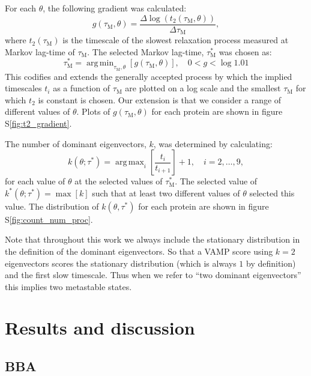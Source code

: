 \documentclass[journal=jacsat,manuscript=article]{achemso}
\DeclareMathOperator*{\argmax}{arg\,max}
\DeclareMathOperator*{\argmin}{arg\,min}
\newcommand*\sref[1]{%
    S\ref{#1}}
\begin{document}
For each $\theta$, the following gradient was calculated:
\begin{equation}
    g(\tau_{\mathrm{M}}, \theta) = \frac{\Delta \log{\left(t_{2}(\tau_{\mathrm{M}}, \theta)\right)}}{\Delta \tau_{\mathrm{M}}}, 
\end{equation}
where $t_{2}(\tau_{\mathrm{M}})$ is the timescale of the slowest relaxation process measured at Markov lag-time of $\tau_{\mathrm{M}}$. The selected Markov lag-time, $\tau^{*}_{\mathrm{M}}$ was chosen as:
\begin{equation}
    \tau^{*}_{\mathrm{M}}  = \argmin_{\tau_{\mathrm{M}}, \theta}\left[g(\tau_{\mathrm{M}}, \theta)\right], \quad 0 < g < \log{1.01}
\end{equation}
This codifies and extends the generally accepted process by which the implied timescales $t_{i}$ as a function of $\tau_{\mathrm{M}}$ are plotted on a log scale and the smallest $\tau_{\mathrm{M}}$ for which $t_{2}$ is constant is chosen. Our extension is that we consider a range of different values of $\theta$. Plots of $g(\tau_{\mathrm{M}}, \theta)$ for each protein are shown  in figure \sref{fig:t2_gradient}. 

The number of dominant eigenvectors, $k$, was determined by calculating:
\begin{equation}
    k(\theta; \tau^{*}) = \argmax_{i}{\left[\frac{t_{i}}{t_{i+1}}\right]} + 1, \quad i = 2, \ldots, 9, 
\end{equation}
for each value of $\theta$ at the selected values of $\tau^{*}_{\mathrm{M}}$. The selected value of $k^{*}(\theta; \tau^{*}) = \max{\left[k\right]}$ such that at least two different values of $\theta$  selected this value.  The distribution of $k(\theta, \tau^{*})$ for each protein are shown in figure \sref{fig:count_num_proc}. 

Note that throughout this work we always include the stationary distribution in the definition of the dominant eigenvectors.  So that a VAMP score using $k=2$ eigenvectors scores the stationary distribution (which is always $1$ by definition) and the first slow timescale. Thus when we refer to ``two dominant eigenvectors'' this implies two metastable states. 


\section{Results and discussion}


\subsection{BBA}
\end{document}

